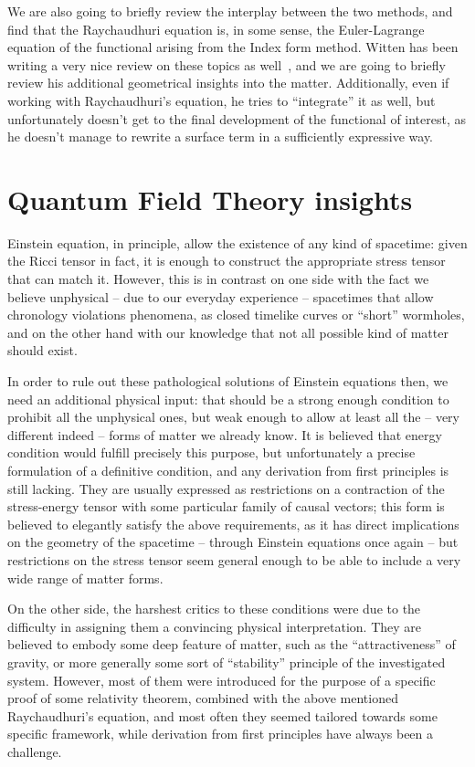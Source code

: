 We are also going to briefly review the interplay between the two methods, and find that the Raychaudhuri equation is, in some sense, the Euler-Lagrange equation of the functional arising from the Index form method. Witten has been writing a very nice review on these topics as well~\cite[]{witten2020light}, and we are going to briefly review his additional geometrical insights into the matter. Additionally, even if working with Raychaudhuri's equation, he tries to ``integrate'' it as well, but unfortunately doesn't get to the final development of the functional of interest, as he doesn't manage to rewrite a surface term in a sufficiently expressive way.

\section{Quantum Field Theory insights}
Einstein equation, in principle, allow the existence of any kind of spacetime: given the Ricci tensor in fact, it is enough to construct the appropriate stress tensor that can match it. However, this is in contrast on one side with the fact we believe unphysical -- due to our everyday experience -- spacetimes that allow chronology violations phenomena, as closed timelike curves or ``short'' wormholes, and on the other hand with our knowledge that not all possible kind of matter should exist.

In order to rule out these pathological solutions of Einstein equations then, we need an additional physical input: that should be a strong enough condition to prohibit all the unphysical ones, but weak enough to allow at least all the -- very different indeed -- forms of matter we already know.
It is believed that energy condition would fulfill precisely this purpose, but unfortunately a precise formulation of a definitive condition, and any derivation from first principles is still lacking. They are usually expressed as restrictions on a contraction of the stress-energy tensor with some particular family of causal vectors; this form is believed to elegantly satisfy the above requirements, as it has direct implications on the geometry of the spacetime -- through Einstein equations once again -- but restrictions on the stress tensor seem general enough to be able to include a very wide range of matter forms.

On the other side, the harshest critics to these conditions were due to the difficulty in assigning them a convincing physical interpretation. They are believed to embody some deep feature of matter, such as the ``attractiveness'' of gravity, or more generally some sort of ``stability'' principle of the investigated system.
However, most of them were introduced for the purpose of a specific proof of some relativity theorem, combined with the above mentioned Raychaudhuri's equation, and most often they seemed tailored towards some specific framework, while derivation from first principles have always been a challenge.

